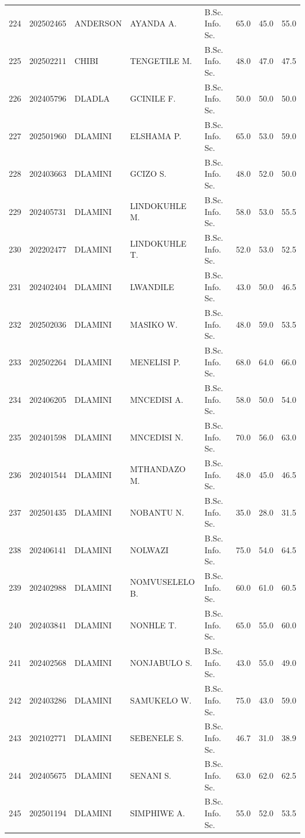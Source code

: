 \documentclass[12pt]{article}
\begin{document}
\begin{longtable}{@{}llllllll@{}}
224 & 202502465 & ANDERSON & AYANDA A. & B.Sc. Info. Sc. & 65.0 & 45.0 & 55.0 \\
225 & 202502211 & CHIBI & TENGETILE M. & B.Sc. Info. Sc. & 48.0 & 47.0 & 47.5 \\
226 & 202405796 & DLADLA & GCINILE F. & B.Sc. Info. Sc. & 50.0 & 50.0 & 50.0 \\
227 & 202501960 & DLAMINI & ELSHAMA P. & B.Sc. Info. Sc. & 65.0 & 53.0 & 59.0 \\
228 & 202403663 & DLAMINI & GCIZO S. & B.Sc. Info. Sc. & 48.0 & 52.0 & 50.0 \\
229 & 202405731 & DLAMINI & LINDOKUHLE M. & B.Sc. Info. Sc. & 58.0 & 53.0 & 55.5 \\
230 & 202202477 & DLAMINI & LINDOKUHLE T. & B.Sc. Info. Sc. & 52.0 & 53.0 & 52.5 \\
231 & 202402404 & DLAMINI & LWANDILE & B.Sc. Info. Sc. & 43.0 & 50.0 & 46.5 \\
232 & 202502036 & DLAMINI & MASIKO W. & B.Sc. Info. Sc. & 48.0 & 59.0 & 53.5 \\
233 & 202502264 & DLAMINI & MENELISI P. & B.Sc. Info. Sc. & 68.0 & 64.0 & 66.0 \\
234 & 202406205 & DLAMINI & MNCEDISI A. & B.Sc. Info. Sc. & 58.0 & 50.0 & 54.0 \\
235 & 202401598 & DLAMINI & MNCEDISI N. & B.Sc. Info. Sc. & 70.0 & 56.0 & 63.0 \\
236 & 202401544 & DLAMINI & MTHANDAZO M. & B.Sc. Info. Sc. & 48.0 & 45.0 & 46.5 \\
237 & 202501435 & DLAMINI & NOBANTU N. & B.Sc. Info. Sc. & 35.0 & 28.0 & 31.5 \\
238 & 202406141 & DLAMINI & NOLWAZI & B.Sc. Info. Sc. & 75.0 & 54.0 & 64.5 \\
239 & 202402988 & DLAMINI & NOMVUSELELO B. & B.Sc. Info. Sc. & 60.0 & 61.0 & 60.5 \\
240 & 202403841 & DLAMINI & NONHLE T. & B.Sc. Info. Sc. & 65.0 & 55.0 & 60.0 \\
241 & 202402568 & DLAMINI & NONJABULO S. & B.Sc. Info. Sc. & 43.0 & 55.0 & 49.0 \\
242 & 202403286 & DLAMINI & SAMUKELO W. & B.Sc. Info. Sc. & 75.0 & 43.0 & 59.0 \\
243 & 202102771 & DLAMINI & SEBENELE S. & B.Sc. Info. Sc. & 46.7 & 31.0 & 38.9 \\
244 & 202405675 & DLAMINI & SENANI S. & B.Sc. Info. Sc. & 63.0 & 62.0 & 62.5 \\
245 & 202501194 & DLAMINI & SIMPHIWE A. & B.Sc. Info. Sc. & 55.0 & 52.0 & 53.5 \\

\end{longtable}
\end{document}
